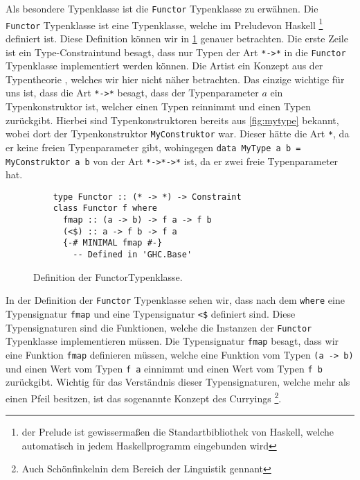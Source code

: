\documentclass{hhuarticle}
\theoremstyle{definition}
\theoremstyle{theorem}
\begin{document}
  Als besondere Typenklasse ist die \verb|Functor| Typenklasse \cite{functorHaskellWiki} zu
  erwähnen. Die \verb|Functor| Typenklasse ist eine Typenklasse, welche
  im \glqq Prelude\grqq  von Haskell
  \footnote{der Prelude ist gewissermaßen die Standartbibliothek von
  Haskell, welche automatisch in jedem Haskellprogramm eingebunden wird}
  definiert ist. Diese Definition können wir in
  \cref{fig:functorTypeClass} genauer betrachten.
  Die erste Zeile ist ein \glqq Type-Constraint\grqq  und besagt, dass
  nur Typen der Art \verb|*->*| in die \verb|Functor| Typenklasse
  implementiert werden können. Die \glqq Art\grqq  ist ein Konzept
  aus der Typentheorie \cite{kindHaskellWiki}, welches wir hier nicht näher betrachten.
  Das einzige wichtige für uns ist, dass die Art \verb|*->*|
  besagt, dass der Typenparameter $a$ ein Typenkonstruktor ist,
  welcher einen Typen reinnimmt und einen Typen zurückgibt.
  Hierbei sind Typenkonstruktoren bereits aus \cref{fig:mytype} bekannt,
  wobei dort der Typenkonstruktor \verb|MyConstruktor| war. Dieser
  hätte die Art \verb|*|, da er keine freien Typenparameter gibt,
  wohingegen \verb|data MyType a b = MyConstruktor a b| von der
  Art \verb|*->*->*| ist, da er zwei freie Typenparameter hat.

  \begin{figure}[h]
    \begin{verbatim}
    type Functor :: (* -> *) -> Constraint
    class Functor f where
      fmap :: (a -> b) -> f a -> f b
      (<$) :: a -> f b -> f a
      {-# MINIMAL fmap #-}
        -- Defined in 'GHC.Base'
    \end{verbatim}
    \caption{Definition der \glqq Functor\grqq  Typenklasse.}%
    \label{fig:functorTypeClass}
  \end{figure}

  In der Definition der \verb|Functor| Typenklasse sehen wir, dass
  nach dem \verb|where| eine Typensignatur \verb|fmap| und eine
  Typensignatur \verb|<$| definiert sind. Diese Typensignaturen
  sind die Funktionen, welche die Instanzen der \verb|Functor| Typenklasse
  implementieren müssen.
  Die Typensignatur \verb|fmap| besagt, dass
  wir eine Funktion \verb|fmap| definieren müssen, welche eine Funktion
  vom Typen \verb|(a -> b)| und einen Wert vom Typen \verb|f a| einnimmt
  und einen Wert vom Typen \verb|f b| zurückgibt. Wichtig für das
  Verständnis dieser Typensignaturen, welche mehr als einen Pfeil besitzen,
  ist das sogenannte Konzept des Curryings
  \footnote{Auch \glqq Schönfinkeln\grqq  in dem Bereich der Linguistik gennant}.
\end{document}
